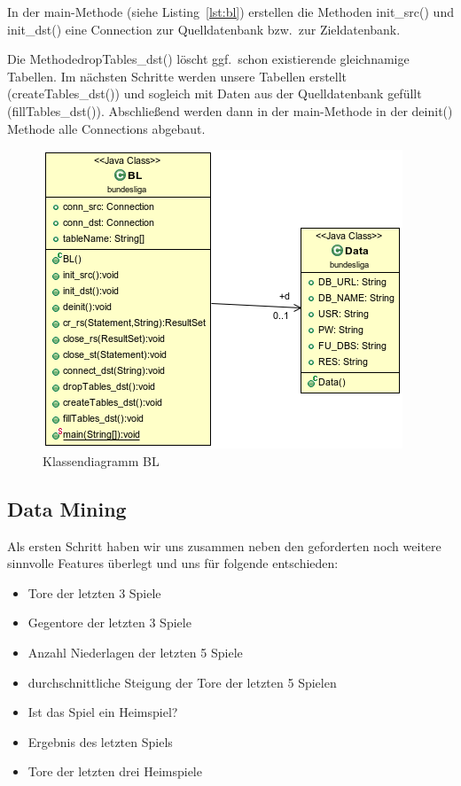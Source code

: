 \documentclass[
10pt,
a4paper
]{scrartcl}
\begin{document}
In der main-Methode (siehe Listing~\ref{lst:bl}) erstellen die Methoden init\_src() und init\_dst() eine Connection zur Quelldatenbank bzw.~zur Zieldatenbank.



Die MethodedropTables\_dst() l\"{o}scht ggf.~schon existierende gleichnamige Tabellen. Im n\"{a}chsten Schritte werden unsere Tabellen erstellt (createTables\_dst()) und sogleich mit Daten aus der Quelldatenbank gef\"{u}llt (fillTables\_dst()). Abschlie{\ss}end werden dann in der main-Methode in der deinit() Methode alle Connections abgebaut.

\begin{figure}[hb]
\centering
\includegraphics[scale=0.7]{BL.png}
\caption{Klassendiagramm BL}
\label{fig4}
\end{figure}

\subsection{Data Mining}
Als ersten Schritt haben wir uns zusammen neben den geforderten noch weitere sinnvolle Features überlegt
und uns für folgende entschieden:

 \begin{itemize}
  \item Tore der letzten 3 Spiele
  \item Gegentore der letzten 3 Spiele
  \item Anzahl Niederlagen der letzten 5 Spiele
  \item durchschnittliche Steigung der Tore der letzten 5 Spielen
  \item Ist das Spiel ein Heimspiel?
  \item Ergebnis des letzten Spiels
  \item Tore der letzten drei Heimspiele
 \end{itemize}
\end{document}
